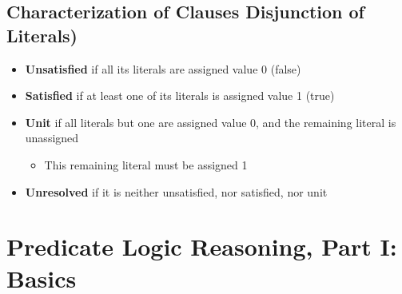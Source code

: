 \documentclass[conference, a4paper]{styles/acmsiggraph}
\begin{document}
    
    \subsection{Characterization of Clauses Disjunction of Literals)}
        \begin{itemize}
            \item \textbf{Unsatisfied} if all its literals are assigned value 0 (false)
            \item \textbf{Satisfied} if at least one of its literals is assigned value 1 (true)
            \item \textbf{Unit} if all literals but one are assigned value 0, and the remaining literal is unassigned
                \begin{itemize}
                    \item This remaining literal must be assigned 1
                \end{itemize}
            \item \textbf{Unresolved} if it is neither unsatisfied, nor satisfied, nor unit
        \end{itemize}
    
    
    
    
    
    
    
    
    
    

    
    
\section{Predicate Logic Reasoning, Part I: Basics}
\end{document}
